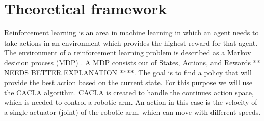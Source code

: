 \section{Theoretical framework}
Reinforcement learning is an area in machine learning in which an agent needs to take actions in an environment which provides the highest reward for that agent. The environment of a reinforcement learning problem
is described as a Markov desicion process (MDP) \cite{markov}. A MDP consists out of States, Actions, and Rewards ** NEEDS BETTER EXPLANATION ****. The goal is to find a policy that will provide the best action based on the current state. 
For this purpose we will use the CACLA algorithm. CACLA is created to handle the continues action space, which is needed to control a robotic arm. An action in this case is the velocity of a single actuator (joint) of the 
robotic arm, which can move with different speeds. 

 
